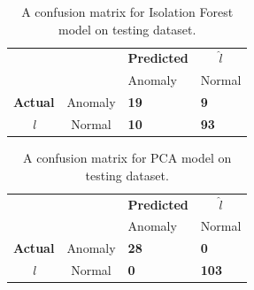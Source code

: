

\begin{table}[!h]
\centering
\begin{tabular}{cccc}
\multicolumn{1}{r}{}                 &                              & \textbf{Predicted}          &   $\hat{l}$                          \\ \cline{3-4} 
                                     & \multicolumn{1}{l|}{}        & \multicolumn{1}{l|}{Anomaly} & \multicolumn{1}{l|}{Normal} \\ \cline{2-4} 
                                      
\multicolumn{1}{l|}{\textbf{Actual}} & \multicolumn{1}{l|}{Anomaly}  & \multicolumn{1}{l|}{\textcolor{customBlue}{\textbf{19}}}     & \multicolumn{1}{l|}{\textcolor{customRed}{\textbf{9}}}      \\ \cline{2-4} 
\multicolumn{1}{c|}{\textit{l}}                & \multicolumn{1}{c|}{Normal} & \multicolumn{1}{l|}{\textcolor{customDarkRed}{\textbf{10}}}     & \multicolumn{1}{l|}{\textcolor{customGreen}{\textbf{93}}}      \\ \cline{2-4} 
\end{tabular}
\caption{A confusion matrix for Isolation Forest model on testing dataset.}
\label{table:confusionMatrix:if}
\end{table}


\begin{table}[!h]
\centering
\begin{tabular}{cccc}
\multicolumn{1}{r}{}                 &                              & \textbf{Predicted}          &   $\hat{l}$                          \\ \cline{3-4} 
                                     & \multicolumn{1}{l|}{}        & \multicolumn{1}{l|}{Anomaly} & \multicolumn{1}{l|}{Normal} \\ \cline{2-4} 
                                      
\multicolumn{1}{l|}{\textbf{Actual}} & \multicolumn{1}{l|}{Anomaly}  & \multicolumn{1}{l|}{\textcolor{customBlue}{\textbf{28}}}     & \multicolumn{1}{l|}{\textcolor{customRed}{\textbf{0}}}      \\ \cline{2-4} 
\multicolumn{1}{c|}{\textit{l}}                & \multicolumn{1}{c|}{Normal} & \multicolumn{1}{l|}{\textcolor{customDarkRed}{\textbf{0}}}     & \multicolumn{1}{l|}{\textcolor{customGreen}{\textbf{103}}}      \\ \cline{2-4} 
\end{tabular}
\caption{A confusion matrix for PCA model on testing dataset.}
\label{table:confusionMatrix:pca}
\end{table}


